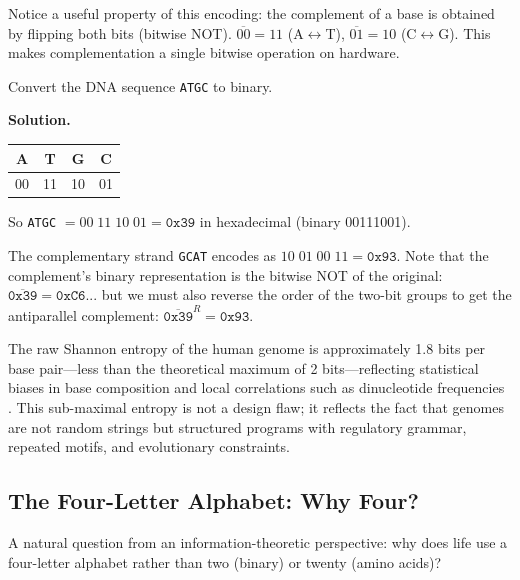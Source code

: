 \begin{remark}
Notice a useful property of this encoding: the complement of a base is obtained by flipping both bits (bitwise NOT). $\overline{00} = 11$ (A$\leftrightarrow$T), $\overline{01} = 10$ (C$\leftrightarrow$G). This makes complementation a single bitwise operation on hardware.
\end{remark}

\begin{example}
Convert the DNA sequence \texttt{ATGC} to binary.

\textbf{Solution.}
\begin{center}
\begin{tabular}{cccc}
A & T & G & C \\
\midrule
00 & 11 & 10 & 01 \\
\end{tabular}
\end{center}
So \texttt{ATGC} $= 00\;11\;10\;01 = \texttt{0x39}$ in hexadecimal (binary 00111001).

The complementary strand \texttt{GCAT} encodes as $10\;01\;00\;11 = \texttt{0x93}$. Note that the complement's binary representation is the bitwise NOT of the original: $\overline{\texttt{0x39}} = \texttt{0xC6}$... but we must also reverse the order of the two-bit groups to get the antiparallel complement: $\overline{\texttt{0x39}}^R = \texttt{0x93}$.
\end{example}

\begin{bioinsight}
The raw Shannon entropy of the human genome is approximately 1.8 bits per base pair---less than the theoretical maximum of 2 bits---reflecting statistical biases in base composition and local correlations such as dinucleotide frequencies \citep{mantegna1994}. This sub-maximal entropy is not a design flaw; it reflects the fact that genomes are not random strings but structured programs with regulatory grammar, repeated motifs, and evolutionary constraints.
\end{bioinsight}

\subsection{The Four-Letter Alphabet: Why Four?}

A natural question from an information-theoretic perspective: why does life use a four-letter alphabet rather than two (binary) or twenty (amino acids)?

